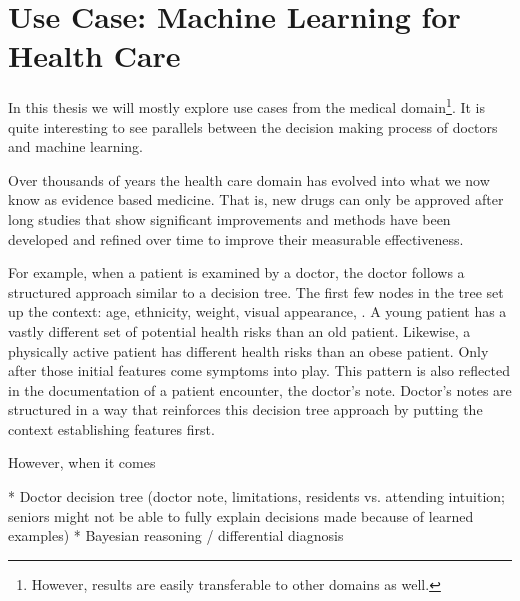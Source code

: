 \section{Use Case: Machine Learning for Health Care}
In this thesis we will mostly explore use cases from the medical domain\footnote{However, results are easily transferable to other domains as well.}.
It is quite interesting to see parallels between the decision making process of doctors and machine learning.

Over thousands of years the health care domain has evolved into what we now know as evidence based medicine.
That is, new drugs can only be approved after long studies that show significant improvements and methods have been developed and refined over time to improve their measurable effectiveness.

For example, when a patient is examined by a doctor, the doctor follows a structured approach similar to a decision tree.
The first few nodes in the tree set up the context: age, ethnicity, weight, visual appearance, \etc.
A young patient has a vastly different set of potential health risks than an old patient.
Likewise, a physically active patient has different health risks than an obese patient.
Only after those initial features come symptoms into play.
This pattern is also reflected in the documentation of a patient encounter, the doctor's note.
Doctor's notes are structured in a way that reinforces this decision tree approach by putting the context establishing features first.

However, when it comes \todo{}

* Doctor decision tree (doctor note, limitations, residents vs. attending intuition; seniors might not be able to fully explain decisions made because of learned examples)
* Bayesian reasoning / differential diagnosis

